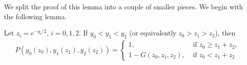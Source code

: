 
We split the proof of this lemma into a couple of smaller pieces. We begin with the following lemma.
\begin{lemma}\label{lem:ordered}
Let $z_i = e^{-y_i/2}$, $i=0,1,2$. If $y_0<y_1<y_2$ (or equivalently $z_0 > z_1 > z_2$), then
\begin{align*}
P(y_0(z_0),y_1(z_1),y_2(z_2)) = \begin{cases}
1, &\text{ if } z_0 \geq z_1+z_2,  \\
1-G(z_0,z_1,z_2), &\text{ if } z_0 < z_1+z_2
\end{cases}
\end{align*}
\end{lemma}

